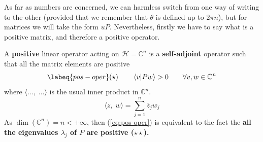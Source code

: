 \documentclass[../main.tex]{subfiles}
\begin{document}
As far as numbers are concerned, we can harmless switch from one way of writing to the other (provided that we remember that $\theta$ is defined up to $2\pi n$), but for matrices we will take the form $uP$. Nevertheless, firstly we have to say what is a positive matrix, and therefore a positive operator.
\begin{definition} A \textbf{positive} linear operator acting on $\mathcal{H}=\mathbb{C}^n$ is a \textbf{self-adjoint} operator such that all the matrix elements are positive
\begin{equation}\labeq{pos-oper}
(\star) \qquad \braket{v}{Pw}>0 \qquad \forall v,w\in\mathbb{C}^n
\end{equation}
where $\langle \dots,\; \dots\rangle$ is the usual inner product in $\mathbb{C}^n$.
\[
\langle z,\;w\rangle = \sum_{j=1}^n\overline{z}_jw_j
\]
As $\dim(\mathbb{C}^n)=n<+\infty$, then (\ref{eq:pos-oper}) is equivalent to the fact the \textbf{all the eigenvalues $\lambda_j$ of $P$ are positive ($\star \star$).}
\end{definition}
\end{document}
